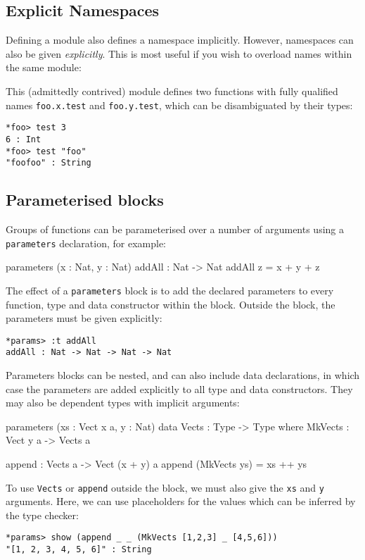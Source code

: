 \subsection{Explicit Namespaces}

Defining a module also defines a namespace implicitly.
However, namespaces can also be given \emph{explicitly}.
This is most useful if you wish to overload names within the same module:


\noindent
This (admittedly contrived) module defines two functions with fully qualified names
\texttt{foo.x.test} and \texttt{foo.y.test}, which can be disambiguated by their types:

\begin{lstlisting}[style=stdout]
*foo> test 3 
6 : Int
*foo> test "foo" 
"foofoo" : String
\end{lstlisting}

\subsection{Parameterised blocks}

Groups of functions can be parameterised over a number of arguments using a \texttt{parameters} declaration, for example:

\begin{code}
parameters (x : Nat, y : Nat)
    addAll : Nat -> Nat
    addAll z = x + y + z
\end{code}

\noindent
The effect of a \texttt{parameters} block is to add the declared parameters to every function, type and data constructor within the block.
Outside the block, the parameters must be given explicitly:

\begin{lstlisting}[style=stdout]
*params> :t addAll
addAll : Nat -> Nat -> Nat -> Nat
\end{lstlisting}

\noindent
Parameters blocks can be nested, and can also include data declarations, in which case the parameters are added explicitly to all type and data constructors.
They may also be dependent types with implicit arguments:

\begin{code}
parameters (xs : Vect x a, y : Nat)
    data Vects : Type -> Type where
         MkVects : Vect y a -> Vects a
  
    append : Vects a -> Vect (x + y) a
    append (MkVects ys) = xs ++ ys
\end{code}

\noindent
To use \texttt{Vects} or \texttt{append} outside the block, we must also give the \texttt{xs} and \texttt{y} arguments.
Here, we can use placeholders for the values which can be inferred by the type checker:

\begin{lstlisting}[style=stdout]
*params> show (append _ _ (MkVects [1,2,3] _ [4,5,6]))
"[1, 2, 3, 4, 5, 6]" : String
\end{lstlisting}

